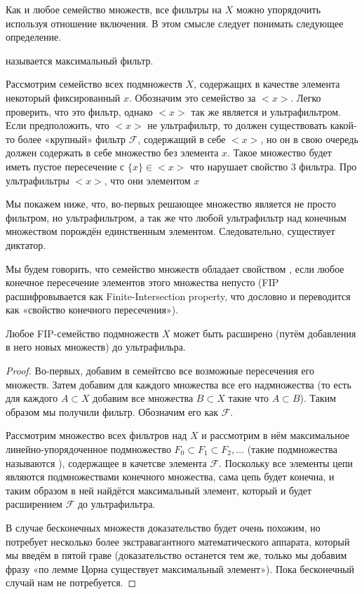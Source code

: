 Как и любое семейство множеств, все фильтры на $X$ можно упорядочить используя отношение включения. В этом смысле следует понимать следующее определение.

\begin{definition}
 называется максимальный фильтр.
\end{definition}

\begin{example}
Рассмотрим семейство всех подмножеств $X$, содержащих в качестве элемента некоторый фиксированный $x$. Обозначим это семейство за $<x>$. Легко проверить, что это фильтр, однако $<x>$ так же является и ультрафильтром. Если предположить, что $<x>$ не ультрафильтр, то должен существовать какой-то более «крупный» фильтр $\mathcal{F}$, содержащий в себе $<x>$, но он в свою очередь должен содержать в себе множество без элемента $x$. Такое множество будет иметь пустое пересечение с $\{x\}\in<x>$ что нарушает свойство 3 фильтра. Про ультрафильтры $<x>$, что они  элементом $x$
\end{example}

Мы покажем ниже, что, во-первых решающее множество является не просто фильтром, но ультрафильтром, а так же что любой ультрафильтр над конечным множеством порождён единственным элементом. Следовательно, существует диктатор.

\begin{definition}
Мы будем говорить, что семейство множеств обладает свойством , если любое конечное пересечение элементов этого множества непусто (FIP расшифровывается как Finite-Intersection property, что дословно и переводится как «свойство конечного пересечения»).
\end{definition}

\begin{lemma}
Любое FIP-семейство подмножеств $X$ может быть расширено (путём добавления в него новых множеств) до ультрафильра.
\end{lemma}
\begin{proof}
Во-первых, добавим в семейтсво все возможные пересечения его множеств. Затем добавим для каждого множества все его надмножества (то есть для каждого $A\subset X$ добавим все множества $B\subset X$ такие что $A\subset B$). Таким образом мы получили фильтр. Обозначим его как $\mathcal{F}$.

Рассмотрим множество всех фильтров над $X$ и рассмотрим в нём максимальное линейно-упорядоченное подмножество $F_0\subset F_1\subset F_2, \ldots$ (такие подмножества называются ), содержащее в качетсве элемента $\mathcal{F}$. Поскольку все элементы цепи являются подмножествами конечного множества, сама цепь будет конечна, и таким образом в ней найдётся максимальный элемент, который и будет расширением $\mathcal{F}$ до ультрафильтра.

В случае бесконечных множеств доказательство будет очень похожим, но потребует несколько более экстравагантного математического аппарата, который мы введём в пятой граве (доказательство останется тем же, только мы добавим фразу «по лемме Цорна существует максимальный элемент»). Пока бесконечный случай нам не потребуется.
\end{proof}

